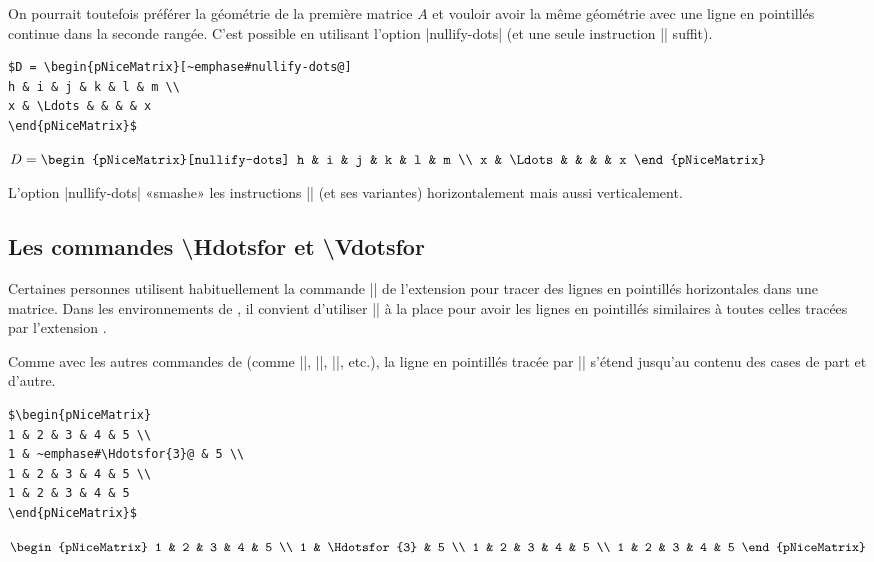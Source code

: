 \documentclass[dvipsnames]{article}%
\begin{document}
\bigskip
On pourrait toutefois préférer la géométrie de la première matrice $A$ et
vouloir avoir la même géométrie avec une ligne en pointillés continue dans la
seconde rangée. C'est possible en utilisant l'option |nullify-dots| (et une
seule instruction |\Ldots| suffit).\par\nobreak

\medskip
\begin{BVerbatim}[baseline=c,boxwidth=10cm]
$D = \begin{pNiceMatrix}[~emphase#nullify-dots@]
h & i & j & k & l & m \\
x & \Ldots & & & & x 
\end{pNiceMatrix}$
\end{BVerbatim}
$D = \begin{pNiceMatrix}[nullify-dots]
h & i & j & k & l & m \\
x & \Ldots & &  &  & x 
\end{pNiceMatrix}$

\medskip
L'option |nullify-dots| «smashe» les instructions |\Ldots| (et ses variantes)
horizontalement mais aussi verticalement.


\subsection{Les commandes \textbackslash Hdotsfor et \textbackslash Vdotsfor}

Certaines personnes utilisent habituellement la commande |\hdotsfor| de
l'extension  pour tracer des lignes en pointillés horizontales dans
une matrice. Dans les environnements de , il convient d'utiliser
|\Hdotsfor| à la place pour avoir les lignes en pointillés similaires à toutes
celles tracées par l'extension .

Comme avec les autres commandes de  (comme |\Cdots|, |\Ldots|,
|\Vdots|, etc.), la ligne en pointillés tracée par |\Hdotsfor| s'étend jusqu'au
contenu des cases de part et d'autre.

\medskip
\begin{BVerbatim}[baseline=c,boxwidth=7cm]
$\begin{pNiceMatrix}
1 & 2 & 3 & 4 & 5 \\
1 & ~emphase#\Hdotsfor{3}@ & 5 \\
1 & 2 & 3 & 4 & 5 \\
1 & 2 & 3 & 4 & 5 
\end{pNiceMatrix}$
\end{BVerbatim}
$\begin{pNiceMatrix}
1 & 2 & 3 & 4 & 5 \\
1 & \Hdotsfor{3} & 5 \\
1 & 2 & 3 & 4 & 5 \\
1 & 2 & 3 & 4 & 5 
\end{pNiceMatrix}$
\end{document}
